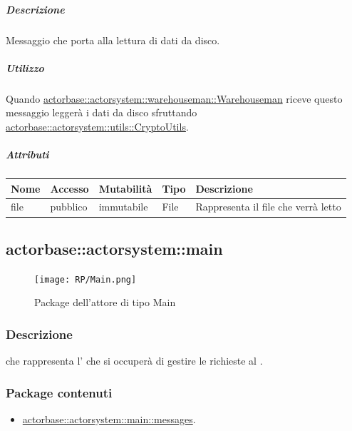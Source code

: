 \documentclass{scalatekids-article}
\begin{document}
\subparagraph{Descrizione}

Messaggio che porta alla lettura di dati da disco.

\subparagraph{Utilizzo}

Quando \hyperref[sec:actorbase::actorsystem::warehouseman::Warehouseman]{actorbase::actorsystem::warehouseman::Warehouseman}
riceve questo messaggio leggerà i dati da disco sfruttando
\hyperref[sec:actorbase::actorsystem::utils::CryptoUtils]{actorbase::actorsystem::utils::CryptoUtils}.

\subparagraph{Attributi}
\begin{tabular}{| p{3cm} | p{1.5cm} | p{2cm} | p{2cm} | p{8.5cm} |}
  \hline
  Nome & Accesso & Mutabilità & Tipo & Descrizione\\
  \hline
  file & pubblico & immutabile & File & Rappresenta il file che verrà letto \\
  \hline
\end{tabular}


\subsection{actorbase::actorsystem::main} %
\label{sec:actorbase::actorsystem::main}

\begin{figure}[H]
  \begin{center}
    \texttt{[image: RP/Main.png]}
    \caption{Package dell'attore di tipo Main}
  \end{center}
\end{figure}

\subsubsection{Descrizione}
 che rappresenta l' che si occuperà di gestire le
richieste al .

\subsubsection{Package contenuti}
\begin{itemize}
\item \hyperref[sec:actorbase::actorsystem::main::messages]{actorbase::actorsystem::main::messages}.
\end{itemize}
\end{document}
